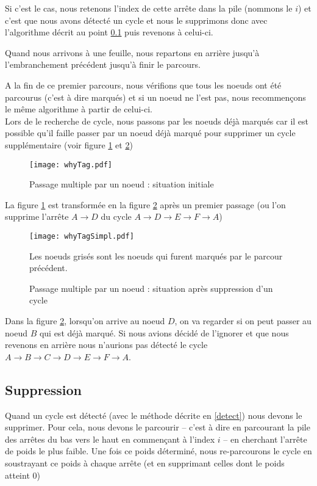 \documentclass[12pt, oneside]{article}
\begin{document}
Si c'est le cas, nous retenons l'index de cette arrête dans la pile (nommons le $i$) et c'est que nous avons détecté un cycle et nous le supprimons donc avec l'algorithme décrit au point \ref{del} puis revenons à celui-ci.

Quand nous arrivons à une feuille, nous repartons en arrière jusqu'à l'embranchement précédent jusqu'à finir le parcours.

A la fin de ce premier parcours, nous vérifions que tous les noeuds ont été parcourus (c'est à dire marqués) et si un noeud ne l'est pas, nous recommençons le même algorithme à partir de celui-ci.\\

Lors de le recherche de cycle, nous passons par les noeuds déjà marqués car il est possible qu'il faille passer par un noeud déjà marqué pour supprimer un cycle supplémentaire (voir figure \ref{whyTag} et \ref{whyTagSimpl})


\begin{figure}[h]
   \caption{\label{whyTag} Passage multiple par un noeud : situation initiale}
   \center
   \texttt{[image: whyTag.pdf]}
\end{figure}

La figure \ref{whyTag} est transformée en la figure \ref{whyTagSimpl} après un premier passage
(ou l'on supprime l'arrête $A \rightarrow D$ du cycle $A \rightarrow D \rightarrow E \rightarrow F \rightarrow A$)

\begin{figure}[h]
   \caption{\label{whyTagSimpl} Passage multiple par un noeud : situation après suppression d'un cycle}
   \center
   \texttt{[image: whyTagSimpl.pdf]}

   Les noeuds grisés sont les noeuds qui furent marqués par le parcour précédent.
\end{figure}


Dans la figure \ref{whyTagSimpl}, lorsqu'on arrive au noeud $D$, on va regarder si on peut passer au noeud $B$ qui est déjà marqué. Si nous avions décidé de l'ignorer et que nous revenons en arrière nous n'aurions pas détecté le cycle $A \rightarrow B \rightarrow C \rightarrow D \rightarrow E \rightarrow F \rightarrow A$.

\subsection{Suppression}
\label{del}

Quand un cycle est détecté (avec le méthode décrite en \ref{detect}) nous devons le supprimer. Pour cela, nous devons le parcourir -- c'est à dire en parcourant la pile des arrêtes du bas vers le haut en commençant à l'index $i$ -- en cherchant l'arrête de poids le plus faible. Une fois ce poids déterminé, nous re-parcourons le cycle en soustrayant ce poids à chaque arrête (et en supprimant celles dont le poids atteint 0)
\end{document}
